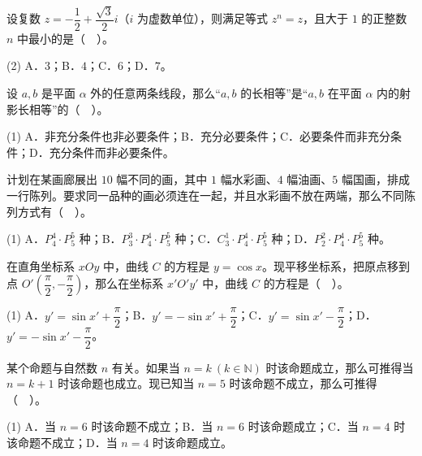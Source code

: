 \begin{question}
设复数 $z=-\dfrac12+\dfrac{\sqrt3}{2}i$（$i$ 为虚数单位），则满足等式 $z^n=z$，且大于 $1$ 的正整数 $n$ 中最小的是（　）。

\begin{gkopts}(2)
\task A．$3$；B．$4$；C．$6$；D．$7$。
\end{gkopts}

\end{question}
\begin{question}
设 $a,b$ 是平面 $\alpha$ 外的任意两条线段，那么“$a,b$ 的长相等”是“$a,b$ 在平面 $\alpha$ 内的射影长相等”的（　）。

\begin{gkopts}(1)
\task A．非充分条件也非必要条件；B．充分必要条件；C．必要条件而非充分条件；D．充分条件而非必要条件。
\end{gkopts}

\end{question}
\begin{question}
计划在某画廊展出 $10$ 幅不同的画，其中 $1$ 幅水彩画、$4$ 幅油画、$5$ 幅国画，排成一行陈列。要求同一品种的画必须连在一起，并且水彩画不放在两端，那么不同陈列方式有（　）。

\begin{gkopts}(1)
\task A．$P_4^4\cdot P_5^5$ 种；B．$P_3^3\cdot P_4^4\cdot P_5^5$ 种；C．$C_3^1\cdot P_4^4\cdot P_5^5$ 种；D．$P_2^2\cdot P_4^4\cdot P_5^5$ 种。
\end{gkopts}

\end{question}
\begin{question}
在直角坐标系 $xOy$ 中，曲线 $C$ 的方程是 $y=\cos x$。现平移坐标系，把原点移到点 $O'\left(\dfrac\pi2,-\dfrac\pi2\right)$，那么在坐标系 $x'O'y'$ 中，曲线 $C$ 的方程是（　）。

\begin{gkopts}(1)
\task A．$y'=\sin x'+\dfrac\pi2$；B．$y'=-\sin x'+\dfrac\pi2$；C．$y'=\sin x'-\dfrac\pi2$；D．$y'=-\sin x'-\dfrac\pi2$。
\end{gkopts}

\end{question}
\begin{question}
某个命题与自然数 $n$ 有关。如果当 $n=k\ (k\in\mathbb N)$ 时该命题成立，那么可推得当 $n=k+1$ 时该命题也成立。现已知当 $n=5$ 时该命题不成立，那么可推得（　）。

\begin{gkopts}(1)
\task A．当 $n=6$ 时该命题不成立；B．当 $n=6$ 时该命题成立；C．当 $n=4$ 时该命题不成立；D．当 $n=4$ 时该命题成立。
\end{gkopts}

\end{question}

